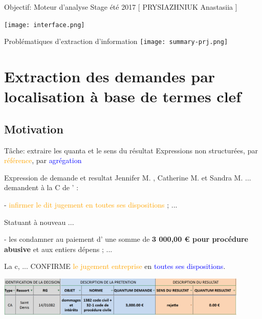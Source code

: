 \documentclass[newPxFont,pagenumber]{beamer}
\begin{document}
\begin{frame}{Objectif: Moteur d'analyse}
Stage été 2017 [ PRYSIAZHNIUK Anastasiia ]
\begin{center}
\texttt{[image: interface.png]}
\end{center}
\end{frame}


\begin{frame}{Problématiques d'extraction d'information}
\centering\texttt{[image: summary-prj.png]}
\end{frame}

\section{Extraction des demandes par localisation à base de termes clef}
\subsection{Motivation}
\begin{frame}{T\^ache: extraire les quanta et le sens du résultat}
\scriptsize
Expressions non structurées, par  \textcolor{orange}{référence}, par \textcolor{blue}{agrégation}
\begin{exampleblock}{Expression de demande et resultat}
\scriptsize
Jennifer M. , Catherine M. et Sandra M. ... demandent à la C de ' :

- \textcolor{orange}{infirmer le dit jugement en toutes ses dispositions} ; ...

Statuant à nouveau ...

- les condamner au paiement d' une somme de  \textbf{3 000,00 € pour procédure abusive} et
aux entiers dépens ; ...

La c, ...  
CONFIRME \textcolor{orange}{le jugement entreprise} en \textcolor{blue}{toutes ses dispositions}.

\end{exampleblock}


\begin{table} 
\centering \includegraphics[width=0.9\textwidth]{tab-danais.png}
\caption{\scriptsize Informations à extraire (Dommages-intérêts pour procédure abusive)}
\end{table}
\end{frame}
\end{document}
